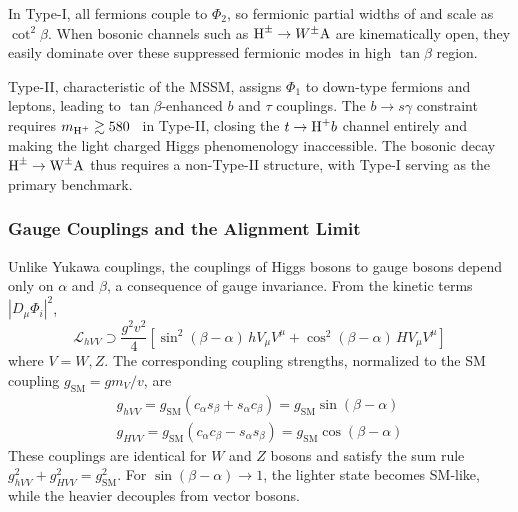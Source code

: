 In Type-I, all fermions couple to $\Phi_2$, so fermionic partial widths of \PA and \PHpm scale as $\cot^2\beta$. When bosonic channels such as $\text{H}^{\pm} \to W^\pm \text{A}$ are kinematically open, they easily dominate over these suppressed fermionic modes in high $\tan\beta$ region.

Type-II, characteristic of the MSSM, assigns $\Phi_1$ to down-type fermions and leptons, leading to $\tan\beta$-enhanced $b$ and $\tau$ couplings. The $b \to s\gamma$ constraint requires $m_{\text{H}^+} \gtrsim 580$\GeV~\cite{Misiak:2017bgg} in Type-II, closing the $t \to \text{H}^+ b$ channel entirely and making the light charged Higgs phenomenology inaccessible. The bosonic decay $\text{H}^{\pm} \to \text{W}^\pm \text{A}$ thus requires a non-Type-II structure, with Type-I serving as the primary benchmark.

\subsubsection{Gauge Couplings and the Alignment Limit}
\label{sec:gauge_couplings}

Unlike Yukawa couplings, the couplings of Higgs bosons to gauge bosons depend only on $\alpha$ and $\beta$, a consequence of gauge invariance. From the kinetic terms $|D_\mu \Phi_i|^2$,
\begin{equation}
\mathcal{L}_{hVV} \supset \frac{g^2 v^2}{4} \left[
  \sin^2(\beta - \alpha) \, h V_\mu V^\mu
  + \cos^2(\beta - \alpha) \, H V_\mu V^\mu
\right]
\label{eq:gauge_lagrangian}
\end{equation}
where $V = W, Z$. The corresponding coupling strengths, normalized to the SM coupling $g_{\text{SM}} = gm_V/v$, are
\begin{gather}
g_{hVV} = g_{\text{SM}} \left(c_\alpha s_\beta + s_\alpha c_\beta\right) = g_{\text{SM}} \sin(\beta - \alpha) \label{eq:ghVV} \\
g_{HVV} = g_{\text{SM}} \left(c_\alpha c_\beta - s_\alpha s_\beta\right) = g_{\text{SM}} \cos(\beta - \alpha) \label{eq:gHVV}
\end{gather}
These couplings are identical for $W$ and $Z$ bosons and satisfy the sum rule $g_{hVV}^2 + g_{HVV}^2 = g_{\text{SM}}^2$. For $\sin(\beta - \alpha) \to 1$, the lighter state \Ph becomes SM-like, while the heavier \PH decouples from vector bosons.

